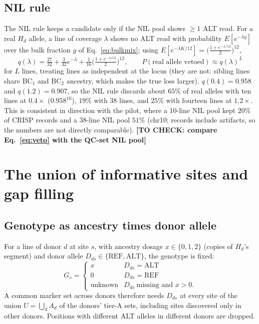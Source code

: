\documentclass[11pt]{article}
\newcommand{\REF}{\mathrm{REF}}
\newcommand{\ALT}{\mathrm{ALT}}
\newcommand{\Hd}{H_d}
\newcommand{\todo}[1]{\textbf{[TO CHECK: #1]}}
\begin{document}
\subsection{NIL rule}
The NIL rule keeps a candidate only if the NIL pool shows $\ge1$ ALT read. For a real $\Hd$ allele, a line of coverage $\lambda$ shows no ALT read with
probability $E[e^{-\lambda g}]$ over the bulk fraction $g$ of Eq.~\eqref{eq:bulkmix}; using
$E[e^{-\lambda K/12}]=\big(\tfrac{1+e^{-\lambda/12}}{2}\big)^{12}$,
\begin{equation}
q(\lambda)=\tfrac{27}{32}+\tfrac{3}{32}e^{-\lambda}+\tfrac{1}{16}\Big(\tfrac{1+e^{-\lambda/12}}{2}\Big)^{12},
\qquad P(\text{real allele vetoed})\approx q(\lambda)^{L}
\label{eq:veto}
\end{equation}
for $L$ lines, treating lines as independent at the locus (they are not: sibling lines share BC$_1$ and BC$_2$ ancestry, which makes the true
loss larger). $q(0.4)=0.958$ and $q(1.2)=0.907$, so the NIL rule discards about $65\%$ of real alleles with ten lines at $0.4\times$
($0.958^{10}$), $19\%$ with 38 lines, and $25\%$ with fourteen lines at $1.2\times$. This is consistent in direction with the pilot, where a
10-line NIL pool kept $20\%$ of CRISP records and a 38-line NIL pool $51\%$ (chr10; records include artifacts, so the numbers are not
directly comparable). \todo{compare Eq.~\eqref{eq:veto} with the QC-set NIL pool}

\section{The union of informative sites and gap filling}
\label{sec:union}

\subsection{Genotype as ancestry times donor allele}
For a line of donor $d$ at site $s$, with ancestry dosage $x\in\{0,1,2\}$ (copies of $\Hd$'s segment) and donor allele $D_{ds}\in\{\REF,\ALT\}$,
the genotype is fixed:
\begin{equation}
G_s=\begin{cases}x & D_{ds}=\ALT\\ 0 & D_{ds}=\REF\\ \text{unknown} & D_{ds}\ \text{missing and } x>0.\end{cases}
\label{eq:projection}
\end{equation}
A common marker set across donors therefore needs $D_{ds}$ at every site of the union $U=\bigcup_d A_d$ of the donors' tier-A sets,
including sites discovered only in other donors. Positions with different ALT alleles in different donors are dropped.
\end{document}
